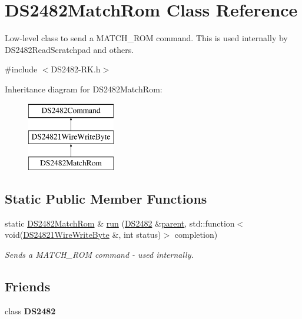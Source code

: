 \hypertarget{class_d_s2482_match_rom}{}\section{D\+S2482\+Match\+Rom Class Reference}
\label{class_d_s2482_match_rom}


Low-\/level class to send a M\+A\+T\+C\+H\+\_\+\+R\+OM command. This is used internally by D\+S2482\+Read\+Scratchpad and others.  




{\ttfamily \#include $<$D\+S2482-\/\+R\+K.\+h$>$}

Inheritance diagram for D\+S2482\+Match\+Rom\+:\begin{figure}[H]
\begin{center}
\leavevmode
\includegraphics[height=3.000000cm]{class_d_s2482_match_rom}
\end{center}
\end{figure}
\subsection*{Static Public Member Functions}
\begin{DoxyCompactItemize}
\item 
\mbox{\label{class_d_s2482_match_rom_acd4303311cf3df03c68d07f9c3a29ff5}} 
static \mbox{\hyperlink{class_d_s2482_match_rom}{D\+S2482\+Match\+Rom}} \& \mbox{\hyperlink{class_d_s2482_match_rom_acd4303311cf3df03c68d07f9c3a29ff5}{run}} (\mbox{\hyperlink{class_d_s2482}{D\+S2482}} \&\mbox{\hyperlink{class_d_s2482_command_a54a41fb8a610ef2077f5e5377771aaf3}{parent}}, std\+::function$<$ void(\mbox{\hyperlink{class_d_s24821_wire_write_byte}{D\+S24821\+Wire\+Write\+Byte}} \&, int status)$>$ completion)
\begin{DoxyCompactList}\small\item\em Sends a M\+A\+T\+C\+H\+\_\+\+R\+OM command -\/ used internally. \end{DoxyCompactList}\end{DoxyCompactItemize}
\subsection*{Friends}
\begin{DoxyCompactItemize}
\item 
\mbox{\label{class_d_s2482_match_rom_afeaf69274324e8dbeebede05c02d9c18}} 
class {\bfseries D\+S2482}
\end{DoxyCompactItemize}
